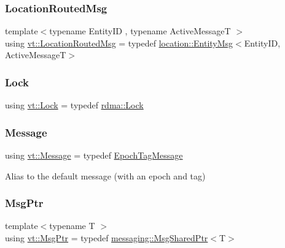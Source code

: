 \mbox{\label{namespacevt_a0cb65f2151629893480ef391def4e733}} 
\subsubsection{\texorpdfstring{Location\+Routed\+Msg}{LocationRoutedMsg}}
{\footnotesize\ttfamily template$<$typename Entity\+ID , typename Active\+MessageT $>$ \\
using \hyperlink{namespacevt_a0cb65f2151629893480ef391def4e733}{vt\+::\+Location\+Routed\+Msg} = typedef \hyperlink{structvt_1_1location_1_1_entity_msg}{location\+::\+Entity\+Msg}$<$Entity\+ID, Active\+MessageT$>$}

\mbox{\label{namespacevt_ae3eb725d1ffe20cd7d82a8c42f3e52ef}} 
\subsubsection{\texorpdfstring{Lock}{Lock}}
{\footnotesize\ttfamily using \hyperlink{namespacevt_1_1rdma_ac5c20b41a653e520b6305d4d454ecb70}{vt\+::\+Lock} = typedef \hyperlink{namespacevt_1_1rdma_ac5c20b41a653e520b6305d4d454ecb70}{rdma\+::\+Lock}}

\mbox{\label{namespacevt_a3a3ddfef40b4c90915fa43cdd5f129ea}} 
\subsubsection{\texorpdfstring{Message}{Message}}
{\footnotesize\ttfamily using \hyperlink{namespacevt_a3a3ddfef40b4c90915fa43cdd5f129ea}{vt\+::\+Message} = typedef \hyperlink{namespacevt_a4ccc13b06bff8a4a35426a1a082a95a9}{Epoch\+Tag\+Message}}



Alias to the default message (with an epoch and tag) 

\mbox{\label{namespacevt_a9f5ebd62ee9d6dd8829e3e1cc4f858e9}} 
\subsubsection{\texorpdfstring{Msg\+Ptr}{MsgPtr}}
{\footnotesize\ttfamily template$<$typename T $>$ \\
using \hyperlink{namespacevt_a9f5ebd62ee9d6dd8829e3e1cc4f858e9}{vt\+::\+Msg\+Ptr} = typedef \hyperlink{structvt_1_1messaging_1_1_msg_shared_ptr}{messaging\+::\+Msg\+Shared\+Ptr}$<$T$>$}



